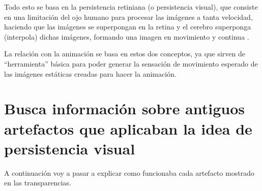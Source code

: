 \documentclass{article}
\begin{document}
\bigskip

Todo esto se basa en la persistencia retiniana (o persistencia visual), que consiste en una limitación del ojo humano para procesar las imágenes a tanta velocidad, haciendo que las imágenes se superpongan en la retina y el cerebro superponga (interpola) dichas imágenes, formando una imagen en movimiento y continua \cite{wikipers}. 

\bigskip

La relación con la animación se basa en estos dos conceptos, ya que sirven de ``herramienta'' básica para poder generar la sensación de movimiento esperado de las imágenes estáticas creadas para hacer la animación. 


\section{Busca información sobre antiguos artefactos que aplicaban la idea de persistencia visual}

A continuación voy a pasar a explicar como funcionaba cada artefacto mostrado en las transparencias.
\end{document}
